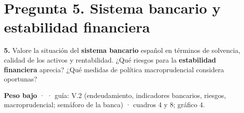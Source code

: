 \clearpage
\section*{Pregunta 5. Sistema bancario y estabilidad financiera}

\begin{enunciado}
\textbf{5.} Valore la situación del \textbf{sistema bancario} español en términos de solvencia, calidad de los activos y rentabilidad. ¿Qué riesgos para la \textbf{estabilidad financiera} aprecia? ¿Qué medidas de política macroprudencial considera oportunas?

\smallskip
\textbf{Peso bajo} ·  · guía: V.2 (endeudamiento, indicadores bancarios, riesgos, macroprudencial; semáforo de la banca) · cuadros 4 y 8; gráfico 4.
\end{enunciado}

